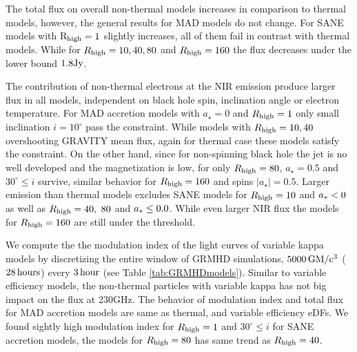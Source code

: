 
The total flux on overall non-thermal models increases in comparison to thermal models, however, the general results for MAD models do not change. For SANE models with R$_{\rm high}=1$ slightly increases, all of them fail in contrast with thermal models. While for $R_{\rm high}=10,40,80$ and $R_{\rm high}=160$ the flux decreases under the lower bound $1.8 \rm {Jy}$.


The contribution of non-thermal electrons at the NIR emission produce larger flux in all models, independent on black hole spin, inclination angle or electron temperature. For MAD accretion models with $a_{\star}=0$ and $R_{\rm high}=1$ only small inclination $i=10^{\circ}$ pass the constraint. While models with $R_{\rm high}=10,40$ overshooting GRAVITY mean flux, again for thermal case these models satisfy the constraint. On the other hand, since for non-spinning black hole the jet is no well developed and the magnetization is low, for only  $R_{\rm high}=80$, $a_{\star}=0.5$ and $30^{\circ} \leq i$ survive, similar behavior for $R_{\rm high}=160$ and spins $|a_{\star}|=0.5$.
Larger emission than thermal models excludes SANE models for $R_{\rm high}=10$ and $a_* < 0$ as well as  $R_{\rm high}=40,~80$ and $a_* \leq 0.0$. While even larger NIR flux the models for $R_{\rm high}=160$ are still under the threshold.


We compute the the modulation index  of the light curves of variable kappa models by discretizing the entire window of GRMHD simulations, $\rm 5000\,GM/c^3$ ($\rm 28\,hours$) every $\rm 3\,hour$ (see Table \ref{tab:GRMHDmodels}). Similar to variable efficiency models, the non-thermal particles with variable kappa has not big impact on the flux at 230GHz. The behavior of modulation index and total flux for MAD accretion models are same as thermal, and variable efficiency eDFs. We found sightly high modulation index for $R_{\rm high}=1$ and $30^{\circ} \leq i$ for SANE accretion models, the models for $R_{\rm high}=80$ has same trend as $R_{\rm high}=40$.


